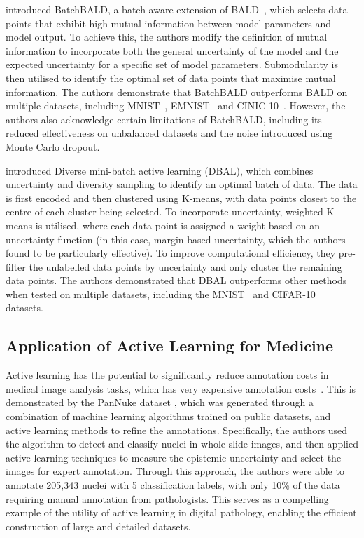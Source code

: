 \cite{kirsch2019batchbald} introduced BatchBALD, a batch-aware extension of BALD~\citep{gal2017deep}, which selects data points that exhibit high mutual information between model parameters and model output. To achieve this, the authors modify the definition of mutual information to incorporate both the general uncertainty of the model and the expected uncertainty for a specific set of model parameters. Submodularity is then utilised to identify the optimal set of data points that maximise mutual information. The authors demonstrate that BatchBALD outperforms BALD on multiple datasets, including MNIST~\citep{lecun1998gradient}, EMNIST~\citep{cohen2017emnist} and CINIC-10~\citep{darlow2018cinic}. However, the authors also acknowledge certain limitations of BatchBALD, including its reduced effectiveness on unbalanced datasets and the noise introduced using Monte Carlo dropout.

\cite{zhdanov2019diverse} introduced Diverse mini-batch active learning (DBAL), which combines uncertainty and diversity sampling to identify an optimal batch of data. The data is first encoded and then clustered using K-means, with data points closest to the centre of each cluster being selected. To incorporate uncertainty, weighted K-means is utilised, where each data point is assigned a weight based on an uncertainty function (in this case, margin-based uncertainty, which the authors found to be particularly effective). To improve computational efficiency, they pre-filter the unlabelled data points by uncertainty and only cluster the remaining data points. The authors demonstrated that DBAL outperforms other methods when tested on multiple datasets, including the MNIST~\citep{lecun1998gradient} and CIFAR-10~\citep{krizhevsky2009learning} datasets.

\subsection{Application of Active Learning for Medicine}
\label{subsec:active_applications}
Active learning has the potential to significantly reduce annotation costs in medical image analysis tasks, which has very expensive annotation costs~\citep{budd2021survey}. This is demonstrated by the PanNuke dataset \citep{gamper2019pannuke, gamper2020pannuke}, which was generated through a combination of machine learning algorithms trained on public datasets, and active learning methods to refine the annotations. Specifically, the authors used the algorithm to detect and classify nuclei in whole slide images, and then applied active learning techniques to measure the epistemic uncertainty and select the images for expert annotation. Through this approach, the authors were able to annotate 205,343 nuclei with 5 classification labels, with only 10\% of the data requiring manual annotation from pathologists. This serves as a compelling example of the utility of active learning in digital pathology, enabling the efficient construction of large and detailed datasets.


